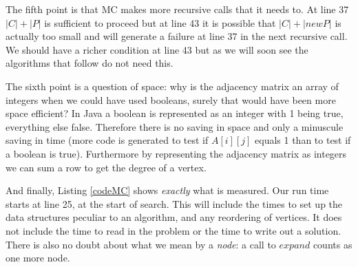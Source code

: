 \documentclass{l4proj}
\begin{document}
The fifth point is that MC makes more recursive calls that it needs to. At line 37 $|C| + |P|$ is sufficient
to proceed but at line 43 it is possible that $|C| + |newP|$ is actually too small and will generate a failure at
line 37 in the next recursive call. We should have a richer condition at line 43 but as we will soon see the
algorithms that follow do not need this. 

The sixth point is a question of space: why is the adjacency matrix an array of integers when we could have used booleans, 
surely that would have been more space efficient? In Java a boolean is represented as an integer with 1 being true,
everything else false. Therefore there is no saving in space and only a minuscule saving in time (more code is generated to 
test if $A[i][j]$ equals 1 than to test if a boolean is true). Furthermore by representing the adjacency matrix
as integers we can sum a row to get the degree of a vertex.

And finally, Listing \ref{codeMC} shows \emph{exactly} what is measured. Our run time starts at line 25, at the start of search.
This will include the times to set up the data structures peculiar to an algorithm, and any reordering of vertices. It does
not include the time to read in the problem or the time to write out a solution. There is also no doubt about what we mean by a 
\emph{node}: a call to $expand$ counts as one more node.


\end{document}
